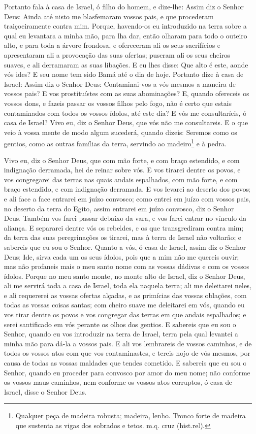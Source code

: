 Portanto fala à casa de Israel, ó filho do homem, e dize-lhe:
Assim diz o Senhor Deus: Ainda até nisto me blasfemaram vossos pais,
e que procederam traiçoeiramente contra mim. Porque,
havendo-os eu introduzido na terra sobre a qual eu levantara a minha
mão, para lha dar, então olharam para todo o outeiro alto, e para
toda a árvore frondosa, e ofereceram ali os seus sacrifícios e
apresentaram ali a provocação das suas ofertas; puseram ali os seus
cheiros suaves, e ali derramaram as suas libações. E eu lhes
disse: Que alto é este, aonde vós ides? E seu nome tem sido Bamá até
o dia de hoje. Portanto dize à casa de Israel: Assim diz o
Senhor Deus: Contaminai-vos a vós mesmos a maneira de vossos pais? E
vos prostituístes com as suas abominações? E, quando
ofereceis os vossos dons, e fazeis passar os vossos filhos pelo
fogo, não é certo que estais contaminados com todos os vossos
ídolos, até este dia? E vós me consultaríeis, ó casa de Israel? Vivo
eu, diz o Senhor Deus, que vós não me consultareis. E o que
veio à vossa mente de modo algum sucederá, quando dizeis: Seremos
como os gentios, como as outras famílias da terra, servindo ao
madeiro\footnote{Qualquer peça de madeira robusta; madeira, lenho.
Tronco forte de madeira que sustenta as vigas dos sobrados e tetos.
m.q. cruz (hist.rel).} e à pedra.

Vivo eu, diz o Senhor Deus, que com mão forte, e com braço
estendido, e com indignação derramada, hei de reinar sobre vós.
E vos tirarei dentre os povos, e vos congregarei das terras
nas quais andais espalhados, com mão forte, e com braço estendido, e
com indignação derramada. E vos levarei ao deserto dos povos;
e ali face a face entrarei em juízo convosco; como entrei em
juízo com vossos pais, no deserto da terra do Egito, assim entrarei
em juízo convosco, diz o Senhor Deus. Também vos farei passar
debaixo da vara, e vos farei entrar no vínculo da aliança. E
separarei dentre vós os rebeldes, e os que transgrediram contra mim;
da terra das suas peregrinações os tirarei, mas à terra de Israel
não voltarão; e sabereis que eu sou o Senhor. Quanto a vós, ó
casa de Israel, assim diz o Senhor Deus; Ide, sirva cada um os seus
ídolos, pois que a mim não me quereis ouvir; mas não profaneis mais
o meu santo nome com as vossas dádivas e com os vossos ídolos.
Porque no meu santo monte, no monte alto de Israel, diz o
Senhor Deus, ali me servirá toda a casa de Israel, toda ela naquela
terra; ali me deleitarei neles, e ali requererei as vossas ofertas
alçadas, e as primícias das vossas oblações, com todas as vossas
coisas santas; com cheiro suave me deleitarei em vós, quando
eu vos tirar dentre os povos e vos congregar das terras em que
andais espalhados; e serei santificado em vós perante os olhos dos
gentios. E sabereis que eu sou o Senhor, quando eu vos
introduzir na terra de Israel, terra pela qual levantei a minha mão
para dá-la a vossos pais. E ali vos lembrareis de vossos
caminhos, e de todos os vossos atos com que vos contaminastes, e
tereis nojo de vós mesmos, por causa de todas as vossas maldades que
tendes cometido. E sabereis que eu sou o Senhor, quando eu
proceder para convosco por amor do meu nome; não conforme os vossos
maus caminhos, nem conforme os vossos atos corruptos, ó casa de
Israel, disse o Senhor Deus.

